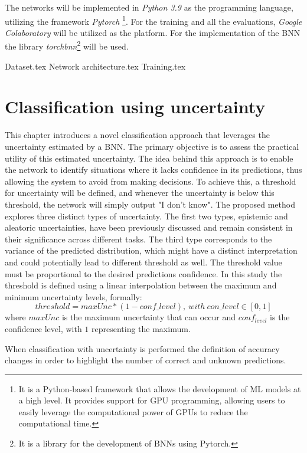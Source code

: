 \documentclass[
	a4paper,
	cleardoublepage=empty,
	headings=twolinechapter,
	numbers=autoenddot,
]{scrbook}
\begin{document}
	The networks will be implemented in \textit{Python 3.9} as the programming language, utilizing the framework \textit{Pytorch} \footnote{It is a Python-based framework that allows the development of ML models at a high level. It provides support for GPU programming, allowing users to easily leverage the computational power of GPUs to reduce the computational time.}\cite{NEURIPS2019_9015}. 
	For the training and all the evaluations, \textit{Google Colaboratory} will be utilized as the platform. For the implementation of the BNN the library \textit{torchbnn}\footnote{It is a library for the development of BNNs using Pytorch.}\cite{Torchbnn} will be used.
	
	{Dataset.tex}
	{Network architecture.tex}
	{Training.tex}
	
	\chapter{Classification using uncertainty}\label{chap:c3}
	
	This chapter introduces a novel classification approach that leverages the uncertainty estimated by a BNN. The primary objective is to assess the practical utility of this estimated uncertainty. The idea behind this approach is to enable the network to identify situations where it lacks confidence in its predictions, thus allowing the system to avoid from making decisions. To achieve this, a threshold for uncertainty will be defined, and whenever the uncertainty is below this threshold, the network will simply output "I don't know". 
	The proposed method explores three distinct types of uncertainty. The first two types, epistemic and aleatoric uncertainties, have been previously discussed and remain consistent in their significance across different tasks. The third type corresponds to the variance of the predicted distribution, which might have a distinct interpretation and could potentially lead to different threshold as well. The threshold value must be proportional to the desired predictions confidence. In this study the threshold is defined using a linear interpolation between the maximum and minimum uncertainty levels, formally:
	\[
		threshold = maxUnc * (1 - conf \_ level), \ with \ con \_ level \in [0,1]
	\]
	where $maxUnc$ is the maximum uncertainty that can occur and $conf_{level}$ is the confidence level, with $1$ representing the maximum.

	When classification with uncertainty is performed the definition of accuracy changes in order to highlight the number of correct and unknown predictions.
	
\end{document}
